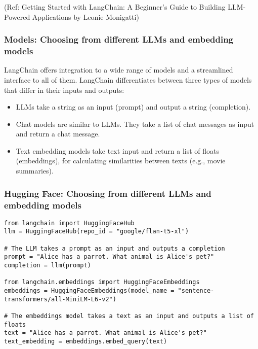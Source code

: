 \begin{frame}[fragile]
\begin{frame}[fragile]
\begin{frame}[fragile]
{\tiny (Ref: Getting Started with LangChain: A Beginner’s Guide to Building LLM-Powered Applications by Leonie Monigatti)}

\end{frame}

\begin{frame}[fragile]\frametitle{Models: Choosing from different LLMs and embedding models}

LangChain offers integration to a wide range of models and a streamlined interface to all of them. LangChain differentiates between three types of models that differ in their inputs and outputs:

\begin{itemize}
\item LLMs take a string as an input (prompt) and output a string (completion).
\item Chat models are similar to LLMs. They take a list of chat messages as input and return a chat message.
\item Text embedding models take text input and return a list of floats (embeddings), for calculating similarities between texts (e.g., movie summaries).
\end{itemize}

\end{frame}

\begin{frame}[fragile]\frametitle{Hugging Face: Choosing from different LLMs and embedding models}

\begin{lstlisting}
from langchain import HuggingFaceHub
llm = HuggingFaceHub(repo_id = "google/flan-t5-xl")

# The LLM takes a prompt as an input and outputs a completion
prompt = "Alice has a parrot. What animal is Alice's pet?"
completion = llm(prompt)

from langchain.embeddings import HuggingFaceEmbeddings
embeddings = HuggingFaceEmbeddings(model_name = "sentence-transformers/all-MiniLM-L6-v2")

# The embeddings model takes a text as an input and outputs a list of floats
text = "Alice has a parrot. What animal is Alice's pet?"
text_embedding = embeddings.embed_query(text)


\end{lstlisting}



\end{frame}
\end{frame}
\end{frame}
